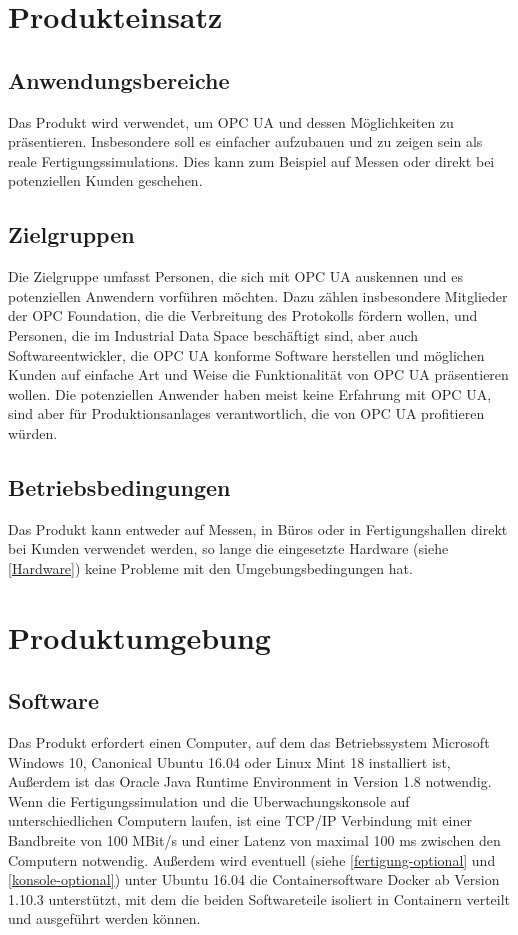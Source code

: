 \documentclass[parskip=full]{scrartcl}
\begin{document}
\newpage
\section{Produkteinsatz}
\subsection{Anwendungsbereiche}
Das Produkt wird verwendet, um \gls{OPC UA} und dessen Möglichkeiten zu präsentieren.
Insbesondere soll es einfacher aufzubauen und zu zeigen sein als reale \glspl{Fertigungssimulation}.
Dies kann zum Beispiel auf Messen oder direkt bei potenziellen Kunden geschehen.

\subsection{Zielgruppen}
Die Zielgruppe umfasst Personen, die sich mit \gls{OPC UA} auskennen und es potenziellen Anwendern vorführen möchten.
Dazu zählen insbesondere Mitglieder der OPC Foundation, die die Verbreitung des Protokolls fördern wollen, und Personen, die im \gls{Industrial Data Space} beschäftigt sind,
aber auch Softwareentwickler, die \gls{OPC UA} konforme Software herstellen und möglichen Kunden auf einfache Art und
Weise die Funktionalität von \gls{OPC UA} präsentieren wollen.
Die potenziellen Anwender haben meist keine Erfahrung mit \gls{OPC UA}, sind aber für \glspl{Produktionsanlage} verantwortlich,
die von \gls{OPC UA} profitieren würden.

\subsection{Betriebsbedingungen}
Das Produkt kann entweder auf Messen, in Büros oder in Fertigungshallen direkt bei Kunden verwendet werden,
so lange die eingesetzte Hardware (siehe \ref{Hardware}) keine Probleme mit den Umgebungsbedingungen hat.

\pagebreak
\section{Produktumgebung}
\subsection{Software}
Das Produkt erfordert einen Computer, auf dem das Betriebssystem Microsoft Windows 10, Canonical Ubuntu 16.04 oder Linux Mint 18 installiert ist,
Außerdem ist das Oracle Java Runtime Environment in Version 1.8
notwendig. Wenn die \gls{Fertigungssimulation} und die \gls{Uberwachungskonsole} auf unterschiedlichen Computern laufen,
ist eine \gls{TCP/IP} Verbindung mit einer Bandbreite von 100 MBit/s und einer Latenz von maximal 100 ms zwischen den Computern notwendig.
Außerdem wird eventuell (siehe \ref{fertigung-optional} und \ref{konsole-optional}) unter Ubuntu 16.04 die Containersoftware Docker
ab Version 1.10.3 unterstützt, mit dem die beiden Softwareteile isoliert in Containern verteilt und ausgeführt werden können.
\end{document}
